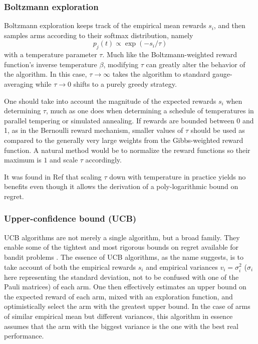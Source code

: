 \subsubsection{Boltzmann exploration}
Boltzmann exploration keeps track of the empirical mean rewards $s_i$, and then samples arms according to their softmax distribution, namely \[p_j(t)\propto\exp(-s_i/\tau)\] with a temperature parameter $\tau$. Much like the Boltzmann-weighted reward function's inverse temperature $\beta$, modifying $\tau$ can greatly alter the behavior of the algorithm. In this case, $\tau\rightarrow\infty$ takes the algorithm to standard gauge-averaging while $\tau\rightarrow 0$ shifts to a purely greedy strategy. 

One should take into account the magnitude of the expected rewards $s_i$ when determining $\tau$, much as one does when determining a schedule of temperatures in parallel tempering or simulated annealing. If rewards are bounded between 0 and 1, as in the Bernoulli reward mechanism, smaller values of $\tau$ should be used as compared to the generally very large weights from the Gibbs-weighted reward function. A natural method would be to normalize the reward functions so their maximum is $1$ and scale $\tau$ accordingly. 

It was found in Ref \cite{vermorel2005multi} that scaling $\tau$ down with temperature in practice yields no benefits even though it allows the derivation of a poly-logarithmic bound on regret. %

\subsubsection{Upper-confidence bound (UCB)}
UCB algorithms are not merely a single algorithm, but a broad family. They enable some of the tightest and most rigorous bounds on regret available for bandit problems \cite{infinitebandits,banditalgorithms}. The essence of UCB algorithms, as the name suggests, is to take account of both the empirical rewards $s_i$ and empirical variances $v_i=\sigma_i^2$ ($\sigma_i$ here representing the standard deviation, not to be confused with one of the Pauli matrices) of each arm. One then effectively estimates an upper bound on the expected reward of each arm, mixed with an exploration function, and optimistically select the arm with the greatest upper bound. In the case of arms of similar empirical mean but different variances, this algorithm in essence assumes that the arm with the biggest variance is the one with the best real performance.

